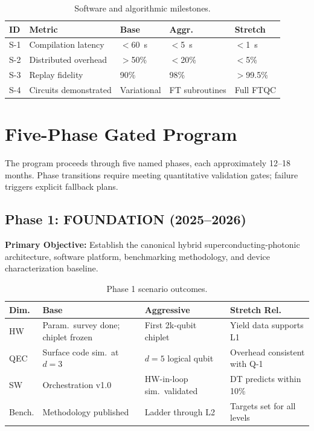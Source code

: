 \documentclass[conference]{IEEEtran}
\begin{document}
\begin{table}[H]
\centering
\caption{Software and algorithmic milestones.}
\label{tab:sw_milestones}
\begin{tabular}{@{}l l l l l@{}}
\toprule
\textbf{ID} & \textbf{Metric} & \textbf{Base} & \textbf{Aggr.} & \textbf{Stretch} \\
\midrule
S-1 & Compilation latency & $<$60~s & $<$5~s & $<$1~s \\
S-2 & Distributed overhead & $>$50\% & $<$20\% & $<$5\% \\
S-3 & Replay fidelity & 90\% & 98\% & $>$99.5\% \\
S-4 & Circuits demonstrated & Variational & FT subroutines & Full FTQC \\
\bottomrule
\end{tabular}
\end{table}

\section{Five-Phase Gated Program}

The program proceeds through five named phases, each approximately 12--18 months. Phase transitions require meeting quantitative validation gates; failure triggers explicit fallback plans.

\subsection{Phase 1: FOUNDATION (2025--2026)}

\textbf{Primary Objective:} Establish the canonical hybrid superconducting-photonic architecture, software platform, benchmarking methodology, and device characterization baseline.

\begin{table}[H]
\centering
\caption{Phase 1 scenario outcomes.}
\begin{tabular}{@{}l L{2cm} L{2cm} L{2cm}@{}}
\toprule
\textbf{Dim.} & \textbf{Base} & \textbf{Aggressive} & \textbf{Stretch Rel.} \\
\midrule
HW & Param.\ survey done; chiplet frozen & First 2k-qubit chiplet & Yield data supports L1 \\
QEC & Surface code sim.\ at $d{=}3$ & $d{=}5$ logical qubit & Overhead consistent with Q-1 \\
SW & Orchestration v1.0 & HW-in-loop sim.\ validated & DT predicts within 10\% \\
Bench. & Methodology published & Ladder through L2 & Targets set for all levels \\
\bottomrule
\end{tabular}
\end{table}
\end{document}
